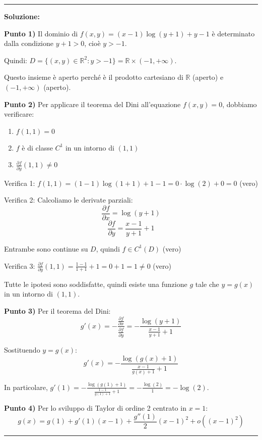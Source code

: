 \documentclass[12pt, a4paper]{article}
\newenvironment{solution}
{\par\noindent\rule{\textwidth}{0.4pt}\par\textbf{Soluzione:}\medskip\par}
{\par\rule{\textwidth}{0.4pt}\par\bigskip}
\begin{document}
\begin{solution}
\textbf{Punto 1)} Il dominio di $f(x,y) = (x-1)\log(y+1) + y - 1$ è determinato dalla condizione $y + 1 > 0$, cioè $y > -1$.

Quindi: $D = \{(x,y) \in \mathbb{R}^2 : y > -1\} = \mathbb{R} \times (-1, +\infty)$.

Questo insieme è aperto perché è il prodotto cartesiano di $\mathbb{R}$ (aperto) e $(-1, +\infty)$ (aperto).

\vspace{0.5cm}

\textbf{Punto 2)} Per applicare il teorema del Dini all'equazione $f(x,y) = 0$, dobbiamo verificare:
\begin{enumerate}
    \item $f(1,1) = 0$
    \item $f$ è di classe $C^1$ in un intorno di $(1,1)$
    \item $\frac{\partial f}{\partial y}(1,1) \neq 0$
\end{enumerate}

Verifica 1: $f(1,1) = (1-1)\log(1+1) + 1 - 1 = 0 \cdot \log(2) + 0 = 0$ (vero)

Verifica 2: Calcoliamo le derivate parziali:
\[
\frac{\partial f}{\partial x} = \log(y+1)
\]
\[
\frac{\partial f}{\partial y} = \frac{x-1}{y+1} + 1
\]

Entrambe sono continue su $D$, quindi $f \in C^1(D)$ (vero)

Verifica 3: $\frac{\partial f}{\partial y}(1,1) = \frac{1-1}{1+1} + 1 = 0 + 1 = 1 \neq 0$ (vero)

Tutte le ipotesi sono soddisfatte, quindi esiste una funzione $g$ tale che $y = g(x)$ in un intorno di $(1,1)$.

\vspace{0.5cm}

\textbf{Punto 3)} Per il teorema del Dini:
\[
g'(x) = -\frac{\frac{\partial f}{\partial x}}{\frac{\partial f}{\partial y}} = -\frac{\log(y+1)}{\frac{x-1}{y+1} + 1}
\]

Sostituendo $y = g(x)$:
\[
g'(x) = -\frac{\log(g(x)+1)}{\frac{x-1}{g(x)+1} + 1}
\]

In particolare, $g'(1) = -\frac{\log(g(1)+1)}{\frac{1-1}{g(1)+1} + 1} = -\frac{\log(2)}{1} = -\log(2)$.

\vspace{0.5cm}

\textbf{Punto 4)} Per lo sviluppo di Taylor di ordine 2 centrato in $x = 1$:
\[
g(x) = g(1) + g'(1)(x-1) + \frac{g''(1)}{2}(x-1)^2 + o((x-1)^2)
\]


\end{solution}
\end{document}
